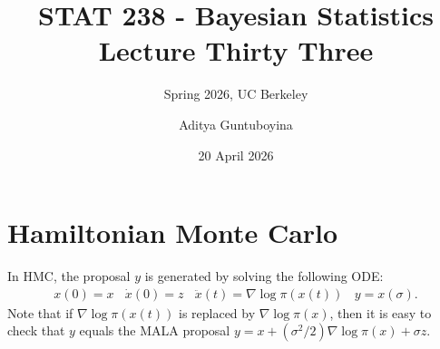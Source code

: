 \documentclass{scrartcl}
\begin{document}
\title{STAT 238 - Bayesian Statistics  \\
  Lecture Thirty Three} 
\subtitle{Spring 2026, UC Berkeley}

\author{Aditya Guntuboyina}


\date{20 April 2026}

\maketitle

\section{Hamiltonian Monte Carlo}

In HMC, the proposal $y$ is generated by solving the following ODE:
\begin{align}\label{hmc_ode}
  x(0) = x ~~~~ \dot{x}(0) = z ~~~~ \ddot{x}(t) = \nabla \log
  \pi(x(t)) ~~~~ y = x(\sigma). 
\end{align}
Note that if $\nabla \log \pi(x(t))$ is replaced by $\nabla \log
\pi(x)$, then it is easy to check that $y$ equals the MALA proposal $y
= x + (\sigma^2/2)\nabla \log \pi(x) + \sigma z$.
\end{document}
